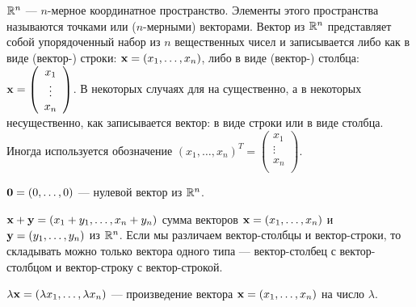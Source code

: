      $\mathbb{R}^{n}$ --- $n$-мерное координатное пространство. Элементы
     этого пространства называются точками или ($n$-мерными) векторами. Вектор из $\mathbb{R}^{n}$
     представляет собой упорядоченный набор из $n$ вещественных чисел и
     записывается либо как в виде (вектор-) строки:
     $\mathbf{x}=(x_{1},\ldots,x_{n})$, либо в виде (вектор-) столбца: $\mathbf{x}=\left(
                                                                            \begin{array}{c}
                                                                              x_{1} \\
                                                                              \vdots\\
                                                                              x_{n} \\
                                                                            \end{array}
                                                                          \right)$.
     В некоторых случаях для на существенно, а в некоторых
     несущественно, как записывается вектор: в виде строки или в
     виде столбца. Иногда используется обозначение
     $(x_{1},\ldots,x_{n})^{T}=\left(
                                                                            \begin{array}{c}
                                                                              x_{1} \\
                                                                              \vdots\\
                                                                              x_{n} \\
                                                                            \end{array}
                                                                          \right)$.

     $\mathbf{0}=(0,\ldots,0)$ --- нулевой вектор из $\mathbb{R}^{n}$.

     $\mathbf{x}+\mathbf{y}=(x_{1}+y_{1},\ldots,x_{n}+y_{n})$ сумма векторов
     $\mathbf{x}=(x_{1},\ldots,x_{n})$ и $\mathbf{y}=(y_{1},\ldots,y_{n})$
     из $\mathbb{R}^{n}$. Если мы различаем вектор-столбцы и вектор-строки,
     то складывать можно только вектора одного типа ---
     вектор-столбец с вектор-столбцом и вектор-строку с
     вектор-строкой.

     $\lambda\mathbf{x}=(\lambda x_{1},\ldots,\lambda x_{n})$ ---
     произведение вектора $\mathbf{x}=(x_{1},\ldots,x_{n})$ на число $\lambda$.

